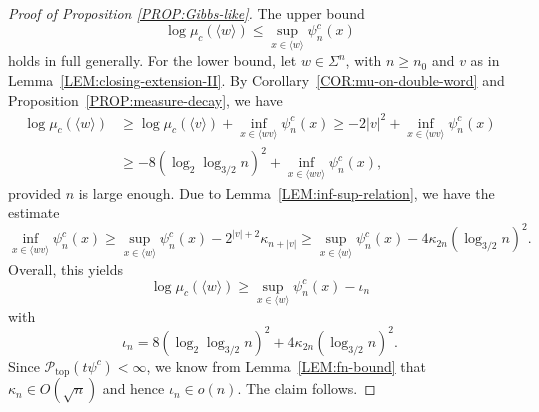 \documentclass[11pt,reqno]{amsart}
\theoremstyle{plain}
\theoremstyle{definition}
\newcommand{\mc}{\mathcal}
\begin{document}
\begin{proof}[Proof of Proposition \ref{PROP:Gibbs-like}]
The upper bound
\[
\log \mu_{c}(\langle w \rangle) \leqslant \sup_{x \in \langle w \rangle} \psi^c_n(x) 
\]
holds in full generally.
For the lower bound, let $w \in \Sigma^n$, with $n \geqslant n_0$ and $v$ as in Lemma~\ref{LEM:closing-extension-II}. By Corollary~\ref{COR:mu-on-double-word} and Proposition~\ref{PROP:measure-decay}, we have
\begin{align*}
\log \mu_c(\langle w \rangle) & 
\geqslant \log \mu_c(\langle v\rangle) + \inf_{x \in \langle wv\rangle} \psi^c_n(x)
\geqslant - 2 |v|^2 + \inf_{x \in \langle wv\rangle}  \psi^c_n(x)
\\ & \geqslant - 8(\log_2 \log_{3/2} n)^2 + \inf_{x \in \langle wv\rangle} \psi^c_n(x),
\end{align*}
provided $n$ is large enough. Due to Lemma~\ref{LEM:inf-sup-relation}, we have the estimate
\[
\inf_{x \in \langle wv\rangle} \psi^c_n(x)
\geqslant \sup_{x \in \langle w \rangle} \psi^c_n(x) - 2^{|v| +2} \kappa_{n + |v|}
\geqslant \sup_{x \in \langle w \rangle} \psi^c_n(x) - 4 \kappa_{2n} (\log_{3/2} n)^2.
\]
Overall, this yields
\[
\log \mu_c(\langle w \rangle) \geqslant \sup_{x \in \langle w \rangle} \psi^c_n(x) - \iota_n
\]
with
\[
\iota_n = 8 (\log_2 \log_{3/2} n)^2 + 4 \kappa_{2n} (\log_{3/2} n)^2.
\]
Since $\mc P_{\operatorname{top}}(t \psi^c) < \infty$, we know from Lemma~\ref{LEM:fn-bound} that $\kappa_n \in O(\sqrt{n})$ and hence $\iota_n \in o(n)$. The claim follows.
\end{proof}
\end{document}
